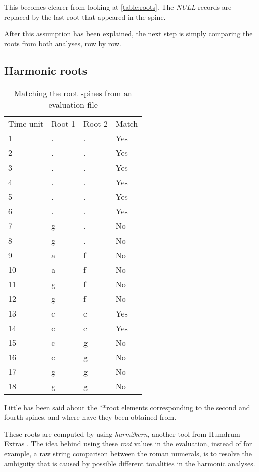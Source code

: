 		This becomes clearer from looking at \autoref{table:roots}. The \emph{NULL} records are replaced by the last root that appeared in the spine.

		After this assumption has been explained, the next step is simply comparing the roots from both analyses, row by row.

	\subsection{Harmonic roots}
		\begin{table}[]
		\centering
		\begin{tabular}{llll}
		Time unit & Root 1 & Root 2 & Match \\
		1 & . & . & Yes \\
		2 & . & . & Yes \\
		3 & . & . & Yes \\
		4 & . & . & Yes \\
		5 & . & . & Yes \\
		6 & . & . & Yes \\
		7 & g & . & No \\
		8 & g & . & No \\
		9 & a & f & No \\
		10 & a & f & No \\
		11 & g & f & No \\
		12 & g & f & No \\
		13 & c & c & Yes \\
		14 & c & c & Yes \\
		15 & c & g & No \\
		16 & c & g & No \\
		17 & g & g & No \\
		18 & g & g & No
		\end{tabular}
		\caption{Matching the root spines from an evaluation file}
		\label{table:matches}
		\end{table}

		Little has been said about the **root elements corresponding to the second and fourth spines, and where have they been obtained from.

		These roots are computed by using \emph{harm2kern}, another tool from Humdrum Extras \cite{humextra}. The idea behind using these \emph{root} values in the evaluation, instead of for example, a raw string comparison between the roman numerals, is to resolve the ambiguity that is caused by possible different tonalities in the harmonic analyses.


